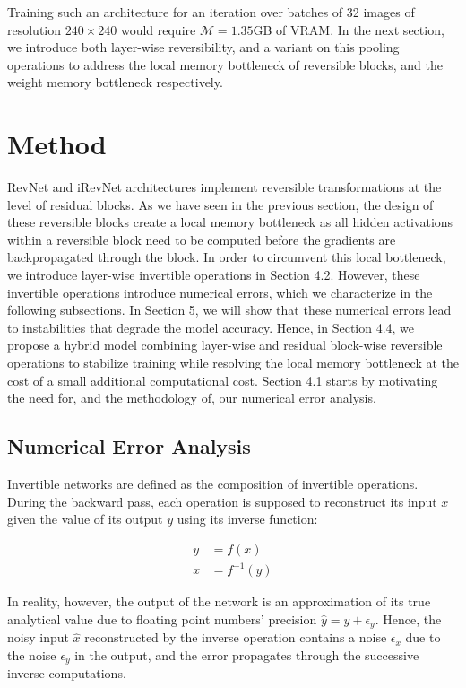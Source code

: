 \documentclass[twocolumn]{bmcart}
\begin{document}
Training such an architecture for an iteration over batches of 32 images of resolution $240 \times 240$ would require $\mathcal{M}=1.35$GB of VRAM.
In the next section, we introduce both layer-wise reversibility, and a variant on this pooling operations to address the local memory bottleneck
of reversible blocks, and the weight memory bottleneck respectively.

\section{Method}

RevNet and iRevNet architectures implement reversible transformations at the level of residual blocks.
As we have seen in the previous section, the design of these reversible blocks create a local memory bottleneck
as all hidden activations within a reversible block need to be computed before the gradients are backpropagated through the block.
In order to circumvent this local bottleneck, we introduce layer-wise invertible operations in Section 4.2.
However, these invertible operations introduce numerical errors, which we characterize in the following subsections.
In Section 5, we will show that these numerical errors lead to instabilities that degrade the model accuracy.
Hence, in Section 4.4, we propose a hybrid model combining layer-wise and residual block-wise reversible operations
to stabilize training while resolving the local memory bottleneck at the cost of a small additional computational cost.
Section 4.1 starts by motivating the need for, and the methodology of, our numerical error analysis.

\subsection{Numerical Error Analysis}

Invertible networks are defined as the composition of invertible operations.
During the backward pass, each operation is supposed to reconstruct its input $x$
given the value of its output $y$ using its inverse function:

 \begin{subequations}
   \begin{align}
   y &= f(x) \\
   x &= f^{-1}(y)
   \end{align}
 \end{subequations}

In reality, however, the output of the network is an approximation of its true analytical value due to floating point numbers' precision $\hat{y}=y+\epsilon_y$.
Hence, the noisy input $\hat{x}$ reconstructed by the inverse operation contains a noise $\epsilon_x$ due to the noise $\epsilon_y$ in the output,
and the error propagates through the successive inverse computations.
\end{document}
